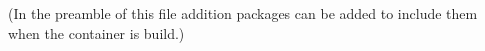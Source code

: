 \documentclass{article}
\begin{document}
(In the preamble of this file addition packages can be added to include them when the container is build.)
\end{document}
